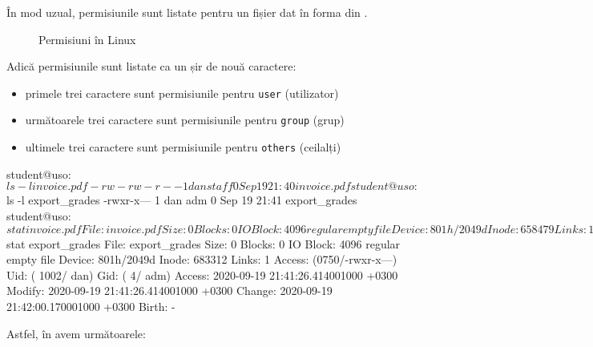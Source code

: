 În mod uzual, permisiunile sunt listate pentru un fișier dat în forma din .

\begin{figure}[htbp]
  \centering
  \def\svgwidth{0.7\columnwidth}
  
  \caption{Permisiuni în Linux}
  \label{fig:user:octal-perm}
\end{figure}

Adică permisiunile sunt listate ca un șir de nouă caractere:

\begin{itemize}
  \item primele trei caractere sunt permisiunile pentru \texttt{user} (utilizator)
  \item următoarele trei caractere sunt permisiunile pentru \texttt{group} (grup)
  \item ultimele trei caractere sunt permisiunile pentru \texttt{others} (ceilalți)
\end{itemize}

\begin{screen}[caption={Listare permisiuni pe fișiere},label={lst:user:list-perm}]
student@uso:~$ ls -l invoice.pdf
-rw-rw-r-- 1 dan staff 0 Sep 19 21:40 invoice.pdf
student@uso:~$ ls -l export_grades
-rwxr-x--- 1 dan adm 0 Sep 19 21:41 export_grades
student@uso:~$ stat invoice.pdf
  File: invoice.pdf
  Size: 0         	Blocks: 0          IO Block: 4096   regular empty file
Device: 801h/2049d	Inode: 658479      Links: 1
Access: (0664/-rw-rw-r--)  Uid: ( 1002/     dan)   Gid: (   50/   staff)
Access: 2020-09-19 21:40:40.242001000 +0300
Modify: 2020-09-19 21:40:40.242001000 +0300
Change: 2020-09-19 21:41:55.110001000 +0300
 Birth: -
student@uso:~$ stat export_grades
  File: export_grades
  Size: 0         	Blocks: 0          IO Block: 4096   regular empty file
Device: 801h/2049d	Inode: 683312      Links: 1
Access: (0750/-rwxr-x---)  Uid: ( 1002/     dan)   Gid: (    4/     adm)
Access: 2020-09-19 21:41:26.414001000 +0300
Modify: 2020-09-19 21:41:26.414001000 +0300
Change: 2020-09-19 21:42:00.170001000 +0300
 Birth: -
\end{screen}

Astfel, în  avem următoarele:

